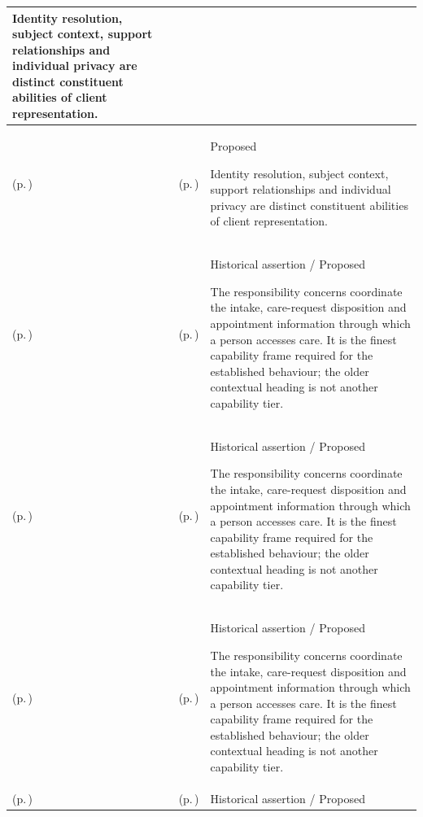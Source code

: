 \begin{longtable}{|>{\raggedright\arraybackslash}p{0.27\TableWidth}|>{\raggedright\arraybackslash}p{0.27\TableWidth}|>{\raggedright\arraybackslash}p{0.46\TableWidth}|}
Identity resolution, subject context, support relationships and individual privacy are distinct constituent abilities of client representation.\\\hline
\nameref{cap:bec-client-administration} (p.\,\pageref{cap:bec-client-administration}) & \nameref{cap:bec-client-privacy} (p.\,\pageref{cap:bec-client-privacy}) & Proposed

Identity resolution, subject context, support relationships and individual privacy are distinct constituent abilities of client representation.\\\hline
\nameref{cap:bec-care-access-transaction-enablement} (p.\,\pageref{cap:bec-care-access-transaction-enablement}) & \nameref{cap:bec-client-centred-administration} (p.\,\pageref{cap:bec-client-centred-administration}) & Historical assertion / Proposed

The responsibility concerns coordinate the intake, care-request disposition and appointment information through which a person accesses care. It is the finest capability frame required for the established behaviour; the older contextual heading is not another capability tier.\\\hline
\nameref{cap:bec-care-access-transaction-enablement} (p.\,\pageref{cap:bec-care-access-transaction-enablement}) & \nameref{cap:bec-referral-administration} (p.\,\pageref{cap:bec-referral-administration}) & Historical assertion / Proposed

The responsibility concerns coordinate the intake, care-request disposition and appointment information through which a person accesses care. It is the finest capability frame required for the established behaviour; the older contextual heading is not another capability tier.\\\hline
\nameref{cap:bec-care-access-transaction-enablement} (p.\,\pageref{cap:bec-care-access-transaction-enablement}) & \nameref{cap:bec-scheduling-administration} (p.\,\pageref{cap:bec-scheduling-administration}) & Historical assertion / Proposed

The responsibility concerns coordinate the intake, care-request disposition and appointment information through which a person accesses care. It is the finest capability frame required for the established behaviour; the older contextual heading is not another capability tier.\\\hline
\nameref{cap:bec-care-fulfilment-administration-enablement} (p.\,\pageref{cap:bec-care-fulfilment-administration-enablement}) & \nameref{cap:bec-episode-encounter-administration} (p.\,\pageref{cap:bec-episode-encounter-administration}) & Historical assertion / Proposed


\end{longtable}
